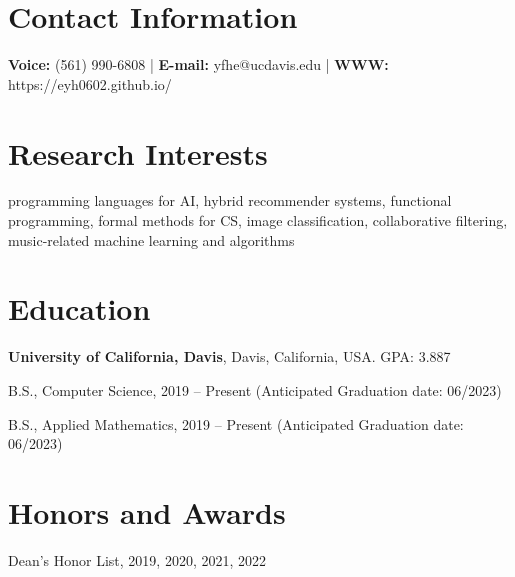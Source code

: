 \documentclass[margin,line]{res}
\newenvironment{list1}{
  \begin{list}{\ding{113}}{%
      \setlength{\itemsep}{0in}
      \setlength{\parsep}{0in} \setlength{\parskip}{0in}
      \setlength{\topsep}{0in} \setlength{\partopsep}{0in} 
      \setlength{\leftmargin}{0.17in}}}{\end{list}}
\begin{document}

\begin{resume}
\section{\sc Contact Information}
\vspace{.05in}
\textbf{Voice:} (561) 990-6808 |
\textbf{E-mail:} yfhe@ucdavis.edu |
\textbf{WWW:} https://eyh0602.github.io/


\section{\sc Research Interests}
programming languages for AI, hybrid recommender systems, functional programming,
formal methods for CS, image classification,
collaborative filtering, music-related machine learning and algorithms

\section{\sc Education}
{\bf University of California, Davis}, Davis, California, USA. GPA: 3.887\\
\vspace*{-.1in}
\begin{list1}
\item[] B.S., Computer Science, 2019 -- Present (Anticipated Graduation date: 06/2023)
\item[] B.S., Applied Mathematics, 2019 -- Present (Anticipated Graduation date: 06/2023)
\end{list1}


\section{\sc Honors and Awards} 
Dean's Honor List, 2019, 2020, 2021, 2022


\end{resume}
\end{document}
